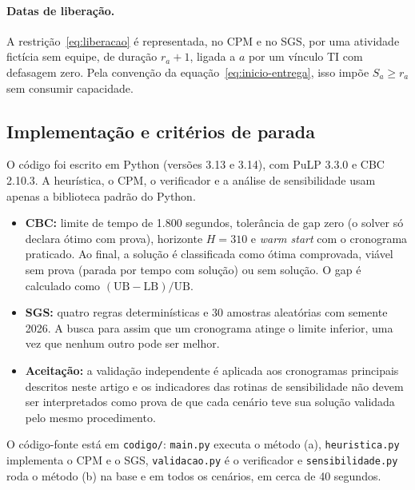 \paragraph{Datas de liberação.}
A restrição~\eqref{eq:liberacao} é representada, no CPM e no SGS, por uma
atividade fictícia sem equipe, de duração $r_a+1$, ligada a $a$ por um
vínculo TI com defasagem zero. Pela convenção da
equação~\eqref{eq:inicio-entrega}, isso impõe $S_a\ge r_a$ sem consumir
capacidade.

\subsection{Implementação e critérios de parada}
\label{sec:implementacao}

O código foi escrito em Python (versões 3.13 e 3.14), com PuLP 3.3.0 e
CBC 2.10.3. A heurística, o CPM, o verificador e a análise de
sensibilidade usam apenas a biblioteca padrão do Python.

\begin{itemize}
  \item \textbf{CBC:} limite de tempo de 1.800 segundos, tolerância de gap
    zero (o solver só declara ótimo com prova), horizonte $H=310$ e
    \emph{warm start} com o cronograma praticado. Ao final, a solução é
    classificada como ótima comprovada, viável sem prova (parada por tempo
    com solução) ou sem solução. O gap é calculado como
    $(\text{UB}-\text{LB})/\text{UB}$.
  \item \textbf{SGS:} quatro regras determinísticas e 30 amostras
    aleatórias com semente 2026. A busca para assim que um cronograma
    atinge o limite inferior, uma vez que nenhum outro pode ser melhor.
  \item \textbf{Aceitação:} a validação independente é aplicada aos
    cronogramas principais descritos neste artigo e os indicadores das
    rotinas de sensibilidade não devem ser interpretados como prova de que
    cada cenário teve sua solução validada pelo mesmo procedimento.
\end{itemize}

O código-fonte está em \texttt{codigo/}: \texttt{main.py} executa o
método (a), \texttt{heuristica.py} implementa o CPM e o SGS,
\texttt{validacao.py} é o verificador e \texttt{sensibilidade.py} roda o
método (b) na base e em todos os cenários, em cerca de 40 segundos.
